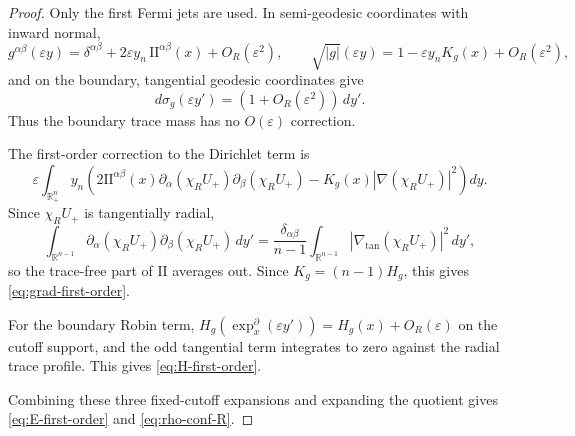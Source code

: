 \documentclass[11pt,reqno,a4paper]{amsart}
\newcommand{\R}{\mathbb{R}}
\numberwithin{equation}{section}
\theoremstyle{plain}
\theoremstyle{remark}
\theoremstyle{plain}
\begin{document}
\begin{proof}
Only the first Fermi jets are used.  In semi-geodesic coordinates with inward
normal,
\[
g^{\alpha\beta}(\varepsilon y)
=
\delta^{\alpha\beta}
+2\varepsilon y_n\,\mathrm{II}^{\alpha\beta}(x)
+O_R(\varepsilon^2),
\qquad
\sqrt{|g|}(\varepsilon y)
=
1-\varepsilon y_nK_g(x)+O_R(\varepsilon^2),
\]
and on the boundary, tangential geodesic coordinates give
\[
d\sigma_g(\varepsilon y')
=
(1+O_R(\varepsilon^2))\,dy'.
\]
Thus the boundary trace mass has no $O(\varepsilon)$ correction.

The first-order correction to the Dirichlet term is
\[
\varepsilon
\int_{\R^n_+}
y_n
\left(
2\mathrm{II}^{\alpha\beta}(x)
\partial_\alpha(\chi_RU_+)\partial_\beta(\chi_RU_+)
-
K_g(x)|\nabla(\chi_RU_+)|^2
\right)dy.
\]
Since $\chi_RU_+$ is tangentially radial,
\[
\int_{\R^{n-1}}
\partial_\alpha(\chi_RU_+)
\partial_\beta(\chi_RU_+)\,dy'
=
\frac{\delta_{\alpha\beta}}{n-1}
\int_{\R^{n-1}}
|\nabla_{\tan}(\chi_RU_+)|^2\,dy',
\]
so the trace-free part of $\mathrm{II}$ averages out.  Since
$K_g=(n-1)H_g$, this gives \eqref{eq:grad-first-order}.

For the boundary Robin term,
$H_g(\exp_x^\partial(\varepsilon y'))=H_g(x)+O_R(\varepsilon)$
on the cutoff support, and the odd tangential term integrates to zero against
the radial trace profile.  This gives \eqref{eq:H-first-order}.

Combining these three fixed-cutoff expansions and expanding the quotient gives
\eqref{eq:E-first-order} and \eqref{eq:rho-conf-R}. %
\end{proof}
\end{document}

